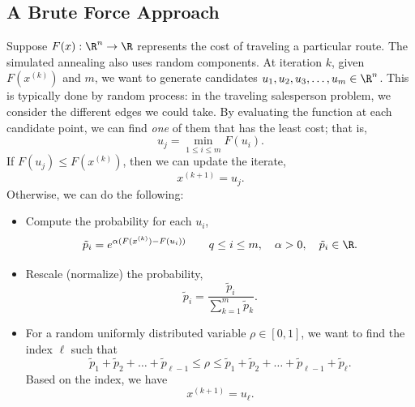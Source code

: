 \documentclass[letterpaper]{article}
\begin{document}
\subsection{A Brute Force Approach}
Suppose $F(x): \R^n \to \R$ represents the cost of traveling a particular route. The simulated annealing also uses random components. At iteration $k$, given $F(x^{(k)})$ and $m$, we want to generate candidates $u_1, u_2, u_3, \hdots, u_m \in \R^n$. This is typically done by random process: in the traveling salesperson problem, we consider the different edges we could take. By evaluating the function at each candidate point, we can find \emph{one} of them that has the least cost; that is, 
\[u_j = \min_{1 \leq i \leq m} F(u_i).\]
If $F(u_j) \leq F(x^{(k)})$, then we can update the iterate, \[x^{(k + 1)} = u_j.\]
Otherwise, we can do the following: 
\begin{itemize}
    \item Compute the probability for each $u_i$,
    \[\tilde{p}_i = e^{\alpha (F(x^{(k)}) - F(u_i))} \qquad q \leq i \leq m, \quad \alpha > 0, \quad \tilde{p}_i \in \R.\]

    \item Rescale (normalize) the probability,
    \[\tilde{p}_i = \frac{\tilde{p}_i}{\sum_{k = 1}^{m} \tilde{p}_k}.\]

    \item For a random uniformly distributed variable $\rho \in [0, 1]$, we want to find the index $\ell$ such that 
    \[\tilde{p}_1 + \tilde{p}_2 + \hdots + \tilde{p}_{\ell - 1} \leq \rho \leq \tilde{p}_1 + \tilde{p}_2 + \hdots + \tilde{p}_{\ell - 1} + \tilde{p}_{\ell}.\]
    Based on the index, we have 
    \[x^{(k + 1)} = u_{\ell}.\]
\end{itemize}
\end{document}
